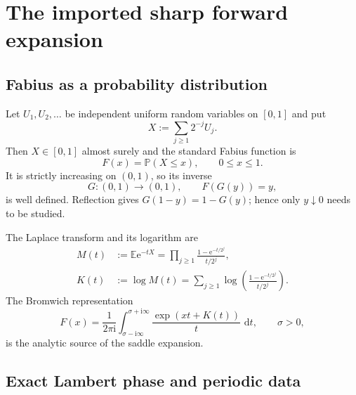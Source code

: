 \documentclass[11pt,oneside]{article}
\numberwithin{equation}{section}
\theoremstyle{definition}
\theoremstyle{remark}
\newcommand{\E}{\mathbb E}
\newcommand{\Prob}{\mathbb P}
\newcommand{\e}{\mathrm e}
\newcommand{\ii}{\mathrm i}
\newcommand{\dd}{\,\mathrm d}
\begin{document}
\section{The imported sharp forward expansion}
\label{sec:forward-input}

\subsection{Fabius as a probability distribution}

Let $U_1,U_2,\ldots$ be independent uniform random variables on $[0,1]$ and
put
\begin{equation}
 X:=\sum_{j\ge1}2^{-j}U_j.
 \label{eq:X-law}
\end{equation}
Then $X\in[0,1]$ almost surely and the standard Fabius function is
\begin{equation}
 F(x)=\Prob(X\le x),\qquad 0\le x\le1.
 \label{eq:F-cdf}
\end{equation}
It is strictly increasing on $(0,1)$, so its inverse
\begin{equation}
 G:(0,1)\longrightarrow(0,1),\qquad F(G(y))=y,
 \label{eq:G-def}
\end{equation}
is well defined.  Reflection gives $G(1-y)=1-G(y)$; hence only $y\downarrow0$
needs to be studied.

The Laplace transform and its logarithm are
\begin{align}
 M(t)&:=\E\e^{-tX}
 =\prod_{j\ge1}\frac{1-\e^{-t/2^j}}{t/2^j},
 \label{eq:M-product}\\
 K(t)&:=\log M(t)
 =\sum_{j\ge1}\log\!\left(\frac{1-\e^{-t/2^j}}{t/2^j}\right).
 \label{eq:K-def}
\end{align}
The Bromwich representation
\begin{equation}
 F(x)=\frac1{2\pi\ii}\int_{\sigma-\ii\infty}^{\sigma+\ii\infty}
       \frac{\exp(xt+K(t))}{t}\,\dd t,
 \qquad \sigma>0,
 \label{eq:Bromwich}
\end{equation}
is the analytic source of the saddle expansion.

\subsection{Exact Lambert phase and periodic data}
\end{document}
